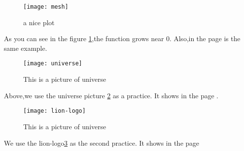 \documentclass[12pt,letterpaper]{article}
\begin{document}
\begin{figure}[h]
    \caption{a nice plot}
    \texttt{[image: mesh]}
    \centering
    \label{fig:mesh1}
\end{figure}

As you can see in the figure \ref{fig:mesh1},the function grows near 0.
Also,in the page \pageref{fig:mesh1} is the same example.


\begin{figure}[h]
    \centering
    \texttt{[image: universe]}
    \caption{This is a picture of universe}
    \label{fig:universe}
\end{figure}

Above,we use the universe picture \ref{fig:universe} as a practice. It shows in the page \pageref{fig:universe}.

\begin{figure}[h]
    \caption{This is a picture of universe}
    \centering
    \texttt{[image: lion-logo]}
    \label{fig:lion}
\end{figure}
We use the lion-logo\ref{fig:lion} as the second practice. It shows in the page \pageref{fig:lion}

\listoffigures
\end{document}
